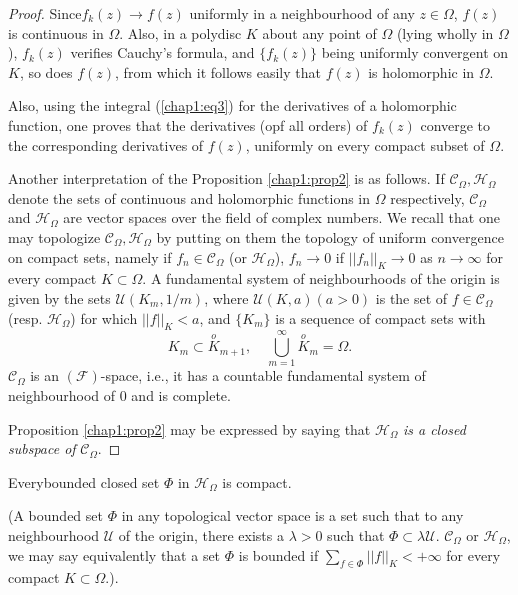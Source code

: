 \begin{proof}
Since\pageoriginale $f_k(z) \to f(z)$ uniformly in a neighbourhood of
any $z\in \Omega$, $f(z)$ is continuous in $\Omega$. Also, in a
polydisc $K$ about any point of $\Omega$ (lying wholly in $\Omega$),
$f_k(z)$ verifies Cauchy's formula, and $\{f_k(z)\}$ being uniformly
convergent on $K$, so does $f(z)$, from which it follows easily that
$f(z)$ is holomorphic in $\Omega$.

Also, using the integral (\ref{chap1:eq3}) for the derivatives of a holomorphic
function, one proves that the derivatives (opf all orders) of $f_k(z)$
converge to the corresponding derivatives of $f(z)$, uniformly on
every compact subset of $\Omega$. 

Another interpretation of the Proposition \ref{chap1:prop2} is as follows. If
$\mathscr{C}_{\Omega}, \mathscr{H}_{\Omega}$ denote the sets of
continuous and holomorphic functions in $\Omega$ respectively,
$\mathscr{C}_{\Omega}$  and $\mathscr{H}_\Omega$ are vector spaces
over the field of complex numbers. We recall that one may topologize
$\mathscr{C}_\Omega, \mathscr{H}_\Omega$  by putting on them the
topology of uniform convergence on compact sets, namely if $f_n \in
\mathscr{C}_\Omega$ (or $\mathscr{H}_\Omega$),  $f_n \to 0$ if
$||f_n||_K \to 0$ as $n \to \infty$ for every compact $K \subset
\Omega$. A fundamental system of neighbourhoods of the origin is given
by the sets $\mathscr{U} (K_m,1/m)$, where $\mathscr{U} (K,a)(a>0)$ is
the set of $f\in \mathscr{C}_\Omega$ (resp. $\mathscr{H}_\Omega$) for
which $||f||_K < a$, and $\{K_m\}$ is a sequence of compact sets with 
$$
K_m \subset \overset{o}{K}_{m+1}, \quad \bigcup\limits^\infty_{m=1}
\overset{o}{K}_m = \Omega.
$$
$\mathscr{C}_\Omega$ is an $(\mathscr{F})$-space, i.e., it has a
countable fundamental system of neighbourhood of 0 and is complete.

Proposition \ref{chap1:prop2} may be expressed by saying that $\mathscr{H}_\Omega$
\textit{is a closed subspace of} $\mathscr{C}_\Omega$.
\end{proof}

\begin{proposition}\label{chap1:prop3}
Every\pageoriginale bounded closed set $\Phi$ in $\mathscr{H}_\Omega$
is compact. 

(A bounded set $\Phi$ in any topological vector space is a set such
that to any neighbourhood $\mathscr{U}$ of the origin, there exists a
$\lambda > 0$ such that $\Phi \subset \lambda
\mathscr{U}$. $\mathscr{C}_\Omega $ or $\mathscr{H}_\Omega$, we may
say equivalently 
that a set $\Phi$ is bounded if $\sum\limits_{f\in\Phi}||f||_K < +
\infty$ for every compact $K\subset \Omega$.).
\end{proposition}

